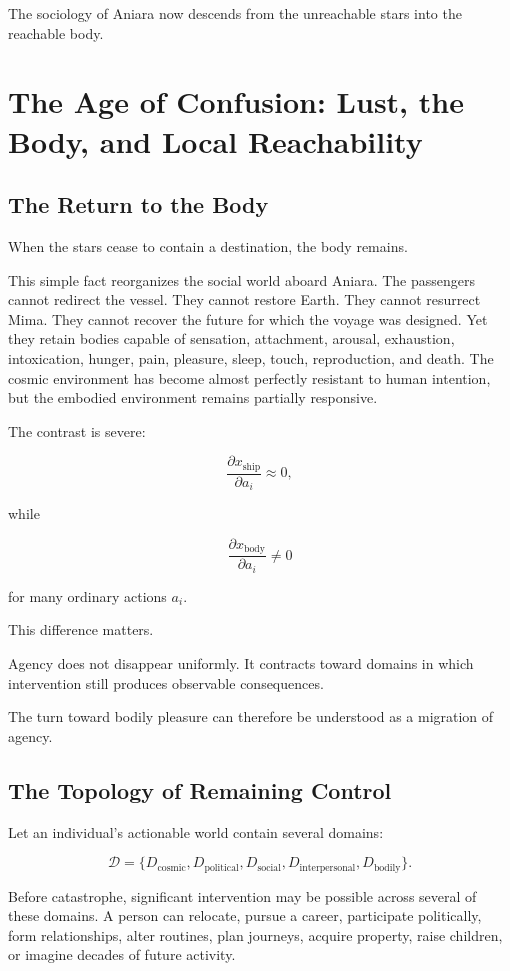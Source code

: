 \documentclass[11pt,oneside]{book}
\theoremstyle{definition}
\theoremstyle{remark}
\begin{document}
The sociology of Aniara now descends from the unreachable stars into the reachable body.

\chapter{The Age of Confusion: Lust, the Body, and Local Reachability}

\section{The Return to the Body}

When the stars cease to contain a destination, the body remains.

This simple fact reorganizes the social world aboard Aniara. The passengers cannot redirect the vessel. They cannot restore Earth. They cannot resurrect Mima. They cannot recover the future for which the voyage was designed. Yet they retain bodies capable of sensation, attachment, arousal, exhaustion, intoxication, hunger, pain, pleasure, sleep, touch, reproduction, and death. The cosmic environment has become almost perfectly resistant to human intention, but the embodied environment remains partially responsive.

The contrast is severe:

\[
\frac{\partial x_{\mathrm{ship}}}{\partial a_i}
\approx 0,
\]

while

\[
\frac{\partial x_{\mathrm{body}}}{\partial a_i}
\neq 0
\]

for many ordinary actions \(a_i\).

This difference matters.

Agency does not disappear uniformly. It contracts toward domains in which intervention still produces observable consequences.

The turn toward bodily pleasure can therefore be understood as a migration of agency.

\section{The Topology of Remaining Control}

Let an individual's actionable world contain several domains:

\[
\mathcal D
=
\{
D_{\mathrm{cosmic}},
D_{\mathrm{political}},
D_{\mathrm{social}},
D_{\mathrm{interpersonal}},
D_{\mathrm{bodily}}
\}.
\]

Before catastrophe, significant intervention may be possible across several of these domains. A person can relocate, pursue a career, participate politically, form relationships, alter routines, plan journeys, acquire property, raise children, or imagine decades of future activity.
\end{document}
